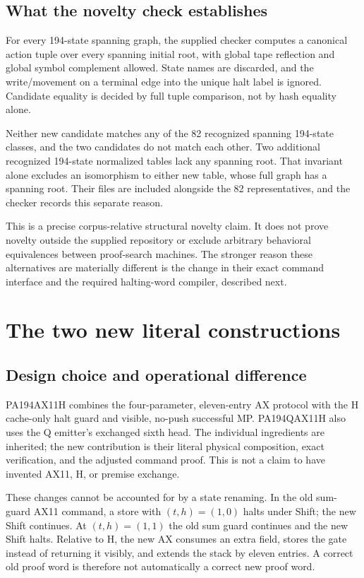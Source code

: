 \documentclass[11pt,a4paper]{article}
\begin{document}
\subsection{What the novelty check establishes}

For every 194-state spanning graph, the supplied checker computes a
canonical action tuple over every spanning initial root, with global
tape reflection and global symbol complement allowed. State names are
discarded, and the write/movement on a terminal edge into the unique
halt label is ignored. Candidate equality is decided by full tuple
comparison, not by hash equality alone.

Neither new candidate matches any of the 82 recognized spanning
194-state classes, and the two candidates do not match each other.
Two additional recognized 194-state normalized tables lack any spanning
root. That invariant alone excludes an isomorphism to either new table,
whose full graph has a spanning root. Their files are included alongside
the 82 representatives, and the checker records this separate reason.

This is a precise corpus-relative structural novelty claim. It does
not prove novelty outside the supplied repository or exclude arbitrary
behavioral equivalences between proof-search machines. The stronger
reason these alternatives are materially different is the change in
their exact command interface and the required halting-word compiler,
described next.

\section{The two new literal constructions}
\label{sec:construction}

\subsection{Design choice and operational difference}

PA194AX11H combines the four-parameter, eleven-entry AX protocol with
the H cache-only halt guard and visible, no-push successful MP.
PA194QAX11H also uses the Q emitter's exchanged sixth head. The
individual ingredients are inherited; the new contribution is their
literal physical composition, exact verification, and the adjusted
command proof. This is not a claim to have invented AX11, H, or premise
exchange\cite{primary,ax11,h,q}.

These changes cannot be accounted for by a state renaming. In the old
sum-guard AX11 command, a store with $(t,h)=(1,0)$ halts under Shift;
the new Shift continues. At $(t,h)=(1,1)$ the old sum guard continues
and the new Shift halts. Relative to H, the new AX consumes an extra
field, stores the gate instead of returning it visibly, and extends the
stack by eleven entries. A correct old proof word is therefore not
automatically a correct new proof word.
\end{document}
